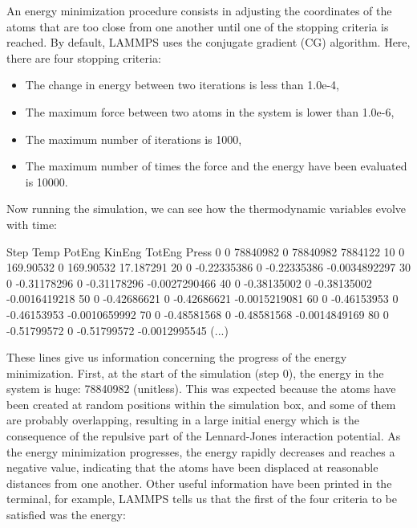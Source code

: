 \begin{tcolorbox}[colback=mylightblue!5!white,colframe=mylightblue!75!black,title=About energy minimization]
An energy minimization procedure consists in adjusting
the coordinates of the atoms that are too close from one another until one of the stopping
criteria is reached. By default, LAMMPS uses the conjugate gradient (CG) algorithm.
Here, there are four stopping criteria:
\begin{itemize}
\item The change in energy between two iterations is less than 1.0e-4,
\item The maximum force between two atoms in the system is lower than 1.0e-6,
\item The maximum number of iterations is 1000,
\item The maximum number of times the force and the energy have been evaluated is 10000.
\end{itemize}
\end{tcolorbox}

\noindent Now running the simulation, we can see how the thermodynamic
variables evolve with time:

\begin{lcverbatim}
Step  Temp  PotEng         KinEng    TotEng         Press     
0     0     78840982       0         78840982       7884122      
10    0     169.90532      0         169.90532      17.187291    
20    0    -0.22335386     0        -0.22335386    -0.0034892297 
30    0    -0.31178296     0        -0.31178296    -0.0027290466 
40    0    -0.38135002     0        -0.38135002    -0.0016419218 
50    0    -0.42686621     0        -0.42686621    -0.0015219081 
60    0    -0.46153953     0        -0.46153953    -0.0010659992 
70    0    -0.48581568     0        -0.48581568    -0.0014849169 
80    0    -0.51799572     0        -0.51799572    -0.0012995545 
(...)
\end{lcverbatim}

\noindent These lines give us information concerning
the progress of the energy minimization. First, at the start
of the simulation (step 0), the energy in the system is
huge: 78840982 (unitless). This was expected because
the atoms have been created at random positions within the
simulation box, and some of them are probably overlapping,
resulting in a large initial energy which is the consequence
of the repulsive part of the Lennard-Jones interaction
potential. As the energy minimization progresses, the energy
rapidly decreases and reaches a negative value, indicating that the atoms have been
displaced at reasonable distances from one another. Other
useful information have been printed in the terminal, for
example, LAMMPS tells us that the first of the four criteria
to be satisfied was the energy:

